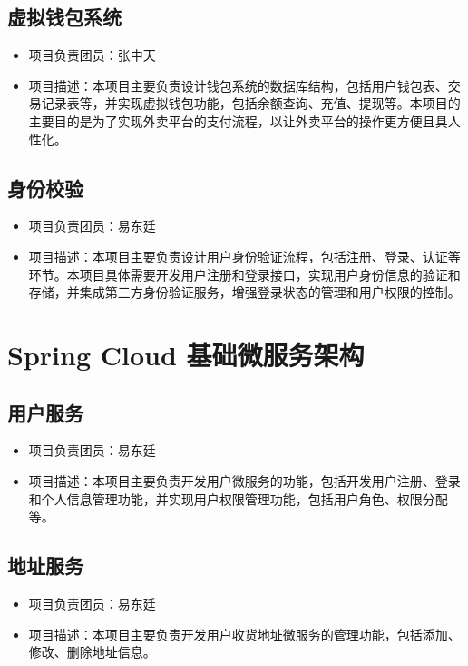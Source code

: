 \subsection{虚拟钱包系统}
\begin{itemize}
    \item{项目负责团员}：张中天
    \item {项目描述}：本项目主要负责设计钱包系统的数据库结构，包括用户钱包表、交易记录表等，并实现虚拟钱包功能，包括余额查询、充值、提现等。本项目的主要目的是为了实现外卖平台的支付流程，以让外卖平台的操作更方便且具人性化。
\end{itemize}

\subsection{身份校验}
\begin{itemize}
    \item{项目负责团员}：易东廷
    \item {项目描述}：本项目主要负责设计用户身份验证流程，包括注册、登录、认证等环节。本项目具体需要开发用户注册和登录接口，实现用户身份信息的验证和存储，并集成第三方身份验证服务，增强登录状态的管理和用户权限的控制。
\end{itemize}

\section{Spring Cloud 基础微服务架构}
\subsection{用户服务}
\begin{itemize}
    \item{项目负责团员}：易东廷
    \item {项目描述}：本项目主要负责开发用户微服务的功能，包括开发用户注册、登录和个人信息管理功能，并实现用户权限管理功能，包括用户角色、权限分配等。
\end{itemize}

\subsection{地址服务}
\begin{itemize}
    \item{项目负责团员}：易东廷
    \item {项目描述}：本项目主要负责开发用户收货地址微服务的管理功能，包括添加、修改、删除地址信息。
\end{itemize}

